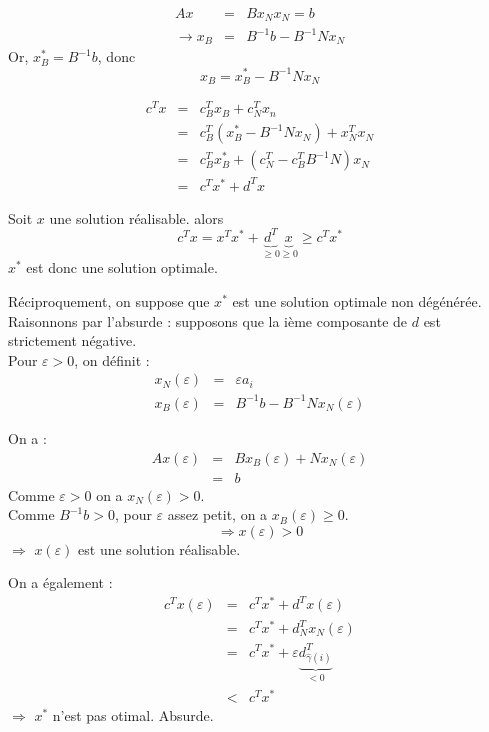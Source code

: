 \begin{dem}
\begin{eqnarray*}
	Ax&=&Bx_Nx_N=b\\
\rightarrow x_B&=&B^{-1}b-B^{-1}Nx_N
\end{eqnarray*}
Or, $x^*_B=B^{-1}b$, donc \[x_B=x^*_B-B^{-1}Nx_N\]

\begin{eqnarray*}
	c^Tx&=&c_B^Tx_B+c^T_Nx_n\\
	&=&c^T_B(x^*_B-B^{-1}Nx_N)+x^T_N x_N\\
	&=&c^T_Bx_B^*+(c^T_N-c^T_BB^{-1}N)x_N\\
	&=&c^Tx^*+d^Tx
\end{eqnarray*}
\end{dem}



\begin{dem}
Soit $x$ une solution réalisable. alors 
\[c^Tx=x^Tx^*+\underbrace{d^T}_{\geq 0}\underbrace{x}_{\geq 0}\geq c^Tx^*\]
$x^*$ est donc une solution optimale.

\bigskip
Réciproquement, on suppose que $x^*$ est une solution optimale non dégénérée.\\
Raisonnons par l'absurde : supposons que la ième composante de $d$ est strictement négative.\\
Pour $\varepsilon>0$, on définit :
\begin{eqnarray*}
	x_N(\varepsilon)&=&\varepsilon a_i\\
	x_B(\varepsilon)&=&B^{-1}b-B^{-1}Nx_N(\varepsilon)
\end{eqnarray*}

On a :
\begin{eqnarray*}
	Ax(\varepsilon)&=&Bx_B(\varepsilon)+Nx_N(\varepsilon)\\
			&=&b
\end{eqnarray*}
Comme $\varepsilon>0$ on a $x_N(\varepsilon)>0$.\\
Comme $B^{-1}b>0$, pour $\varepsilon$ assez petit, on a $x_B(\varepsilon)\geq 0$.\\
\[\Rightarrow x(\varepsilon)>0\]
$\Rightarrow$ $x(\varepsilon)$ est une solution réalisable.

\bigskip
On a également :
\begin{eqnarray*}
	c^Tx(\varepsilon)&=&c^Tx^*+d^Tx(\varepsilon)\\
		&=&c^Tx^*+d^T_Nx_N(\varepsilon)\\
		&=&c^Tx^*+\varepsilon \underbrace{d^T_{\hat{\gamma}(i)}}_{<0}\\
		&<&c^Tx^*
\end{eqnarray*}
$\Rightarrow$ $x^*$ n'est pas otimal. Absurde.
\end{dem}

